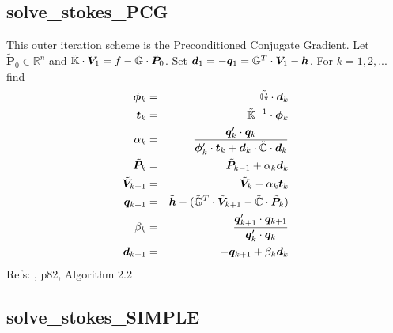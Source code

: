  \subsection{solve\_stokes\_PCG}
 This outer iteration scheme is the Preconditioned Conjugate Gradient.
 Let $\tilde{\bm P}_0 \in \mathbb{R}^n$ 
 and $\tilde{{\mathbb{K}}}\cdot \tilde{\bm V}_1 = \tilde{f} - \tilde{{\mathbb{G}}} \cdot\tilde{\bm P}_0$.
 Set ${\bm d}_1=-{\bm q}_1=\tilde{{\mathbb{G}}}^T \cdot {\bm V}_1 - \tilde{\bm h}$.
 For $k=1,2,...$ find 
 \begin{eqnarray}
 {\bm \phi}_k &=& \tilde{{\mathbb{G}}} \cdot {\bm d}_k \\
 {\bm t}_k    &=& \tilde{{\mathbb{K}}}^{-1} \cdot {\bm \phi}_k \label{eqinner}\\
 \alpha_k &=& \frac{{\bm q}_k' \cdot {\bm q}_k}{{\bm \phi}_k' \cdot {\bm t}_k + {\bm d}_k \cdot \tilde{{\mathbb{C}}} \cdot {\bm d}_k} \\
 \tilde{\bm P}_k &=& \tilde{\bm P}_{k-1} + \alpha_k {\bm d}_k \\
 \tilde{\bm V}_{k+1} &=& \tilde{\bm V}_k -\alpha_k {\bm t}_k \\
 {\bm q}_{k+1} &=& \tilde{\bm h} -(\tilde{{\mathbb{G}}}^T \cdot \tilde{\bm V}_{k+1} -\tilde{{\mathbb{C}}}\cdot \tilde{\bm P}_k )\\
 \beta_k &=& \frac{{\bm q}_{k+1}' \cdot {\bm q}_{k+1}}{{\bm q}_k' \cdot {\bm q}_k } \\
 {\bm d}_{k+1} &=& -{\bm q}_{k+1} + \beta_k {\bm d}_k
 \end{eqnarray}
 Refs: \textcite{elsw}, p82, Algorithm 2.2
 \subsection{solve\_stokes\_SIMPLE}

